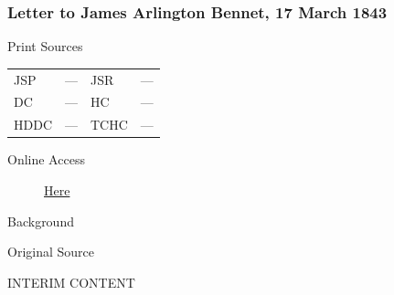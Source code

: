 		\subsubsection{Letter to James Arlington Bennet, 17 March 1843}
			\label{EMS-1843-JS-17-MAR-1843}
			
			\begin{description}
				\item[Print Sources]
			\end{description}

				\begin{tabular}{p{0.5in}p{1in}p{0.5in}p{1in}}
				JSP	 	& ---		& JSR 		& --- \\
				DC	 	& ---		& HC 		& --- \\
				HDDC 	& ---		& TCHC 		& --- \\
				\end{tabular}
			
			\begin{description}
				\item[Online Access] \href{https://www.josephsmithpapers.org/paper-summary/letter-to-james-arlington-bennet-17-march-1843/1}{Here}
			\end{description}
			
			\begin{description}
				\item[Background]
			\end{description}
			
			
			\begin{description}
				\item[Original Source]
			\end{description}
			
				INTERIM CONTENT
			
			
